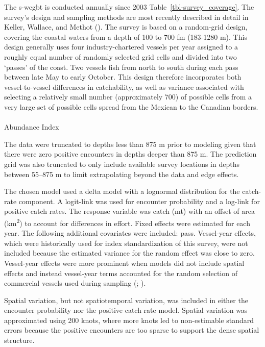 \documentclass[
]{scrartcl}
\makeatletter
\let\oldparagraph\paragraph
\renewcommand{\paragraph}{
    \@ifstar
      \xxxParagraphStar
      \xxxParagraphNoStar
  }
\newcommand{\xxxParagraphStar}[1]{\oldparagraph*{#1}\mbox{}}
\newcommand{\xxxParagraphNoStar}[1]{\oldparagraph{#1}\mbox{}}
\makeatother
\begin{document}
The \gls{s-wcgbt} is conducted annually since 2003
Table~\ref{tbl-survey_coverage}. The survey's design and sampling
methods are most recently described in detail in Keller, Wallace, and
Methot (). The survey is based on a
random-grid design, covering the coastal waters from a depth of 100 to
700 fm (183-1280 m). This design generally uses four industry-chartered
vessels per year assigned to a roughly equal number of randomly selected
grid cells and divided into two `passes' of the coast. Two vessels fish
from north to south during each pass between late May to early October.
This design therefore incorporates both vessel-to-vessel differences in
catchability, as well as variance associated with selecting a relatively
small number (approximately 700) of possible cells from a very large set
of possible cells spread from the Mexican to the Canadian borders.

\paragraph{Abundance Index}\label{abundance-index}

The data were truncated to depths less than 875 m prior to modeling
given that there were zero positive encounters in depths deeper than 875
m. The prediction grid was also truncated to only include available
survey locations in depths between 55--875 m to limit extrapolating
beyond the data and edge effects.

The chosen model used a delta model with a lognormal distribution for
the catch-rate component. A logit-link was used for encounter
probability and a log-link for positive catch rates. The response
variable was catch (mt) with an offset of area (km\textsuperscript{2})
to account for differences in effort. Fixed effects were estimated for
each year. The following additional covariates were included: pass.
Vessel-year effects, which were historically used for index
standardization of this survey, were not included because the estimated
variance for the random effect was close to zero. Vessel-year effects
were more prominent when models did not include spatial effects and
instead vessel-year terms accounted for the random selection of
commercial vessels used during sampling
(;
).

Spatial variation, but not spatiotemporal variation, was included in
either the encounter probability nor the positive catch rate model.
Spatial variation was approximated using 200 knots, where more knots led
to non-estimable standard errors because the positive encounters are too
sparse to support the dense spatial structure.
\end{document}
